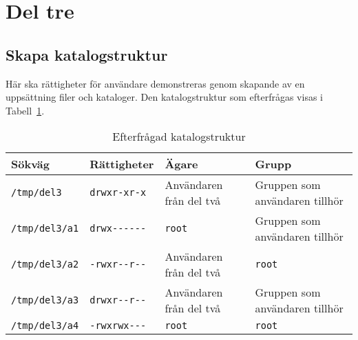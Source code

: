 %
%
%


\section{Del tre}


\subsection{Skapa katalogstruktur}
Här ska rättigheter för användare demonstreras genom skapande av en uppsättning filer
och kataloger. Den katalogstruktur som efterfrågas visas i Tabell~\ref{table:tree}.

\begin{table}[]
  \centering
  \caption{Efterfrågad katalogstruktur}
  \label{table:tree}
  \begin{tabular}{@{}llll@{}}
  \toprule
          Sökväg        & Rättigheter                   & Ägare                    & Grupp                          \\ \midrule
  \texttt{/tmp/del3}    & \texttt{drwxr-xr-x}           & Användaren från del två  & Gruppen som användaren tillhör \\
  \texttt{/tmp/del3/a1} & \texttt{drwx-{}-{}-{}-{}-{}-} & \texttt{root}            & Gruppen som användaren tillhör \\
  \texttt{/tmp/del3/a2} & \texttt{-rwxr-{}-r-{}-}       &  Användaren från del två & \texttt{root}                  \\
  \texttt{/tmp/del3/a3} & \texttt{drwxr-{}-r-{}-}       &  Användaren från del två & Gruppen som användaren tillhör \\
  \texttt{/tmp/del3/a4} & \texttt{-rwxrwx-{}-{}-}       & \texttt{root}            & \texttt{root}                  \\\bottomrule
  \end{tabular}
\end{table}



